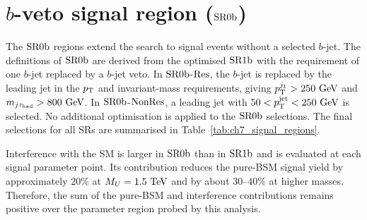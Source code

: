 \section[b-veto signal region (SR0b)]{$b$-veto signal region ($\mathrm{SR0b}$)}
\label{sec:ch7_sr0b}

The $\mathrm{SR0b}$ regions extend the search to signal events without a selected $b$-jet.
The definitions of $\mathrm{SR0b}$ are derived from the optimised $\mathrm{SR1b}$ with the requirement of one $b$-jet replaced by a $b$-jet veto.
In $\mathrm{SR0b}$-$\mathrm{Res}$, the $b$-jet is replaced by the leading jet in the $p_{\mathrm{T}}$ and invariant-mass requirements, giving $p_{\mathrm{T}}^{j_1}>250~\mathrm{GeV}$ and $m_{j\tau_{\mathrm{had}}}>800~\mathrm{GeV}$.
In $\mathrm{SR0b}$-$\mathrm{NonRes}$, a leading jet with $50<p_{\mathrm{T}}^{\mathrm{jet}}<250~\mathrm{GeV}$ is selected.
No additional optimisation is applied to the $\mathrm{SR0b}$ selections.
The final selections for all SRs are summarised in Table~\ref{tab:ch7_signal_regions}.



Interference with the SM is larger in $\mathrm{SR0b}$ than in $\mathrm{SR1b}$ and is evaluated at each signal parameter point.
Its contribution reduces the pure-BSM signal yield by approximately $20\%$ at $M_U=1.5~\mathrm{TeV}$ and by about $30$--$40\%$ at higher masses.
Therefore, the sum of the pure-BSM and interference contributions remains positive over the parameter region probed by this analysis.

